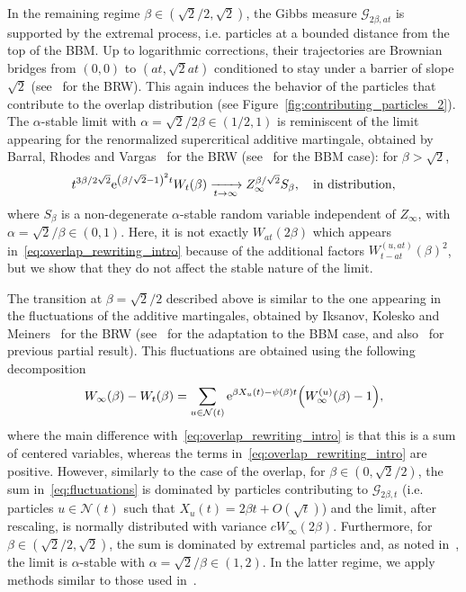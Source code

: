 \documentclass[10pt]{amsart}
\theoremstyle{definition}\newtheorem{defi}[theo]{Definition}\newtheorem{rema}[theo]{Remark}\newtheorem{exam}[theo]{Example}\newtheorem{exem}[theo]{Example}\newtheorem{nota}[theo]{Notation}
\newcommand{\e}{\mathrm{e}}
\newcommand\1{\mathds{1}}
\newcommand{\cG}{\mathcal{G}}
\newcommand{\cN}{\mathcal{N}}
\let\originalleft\left
\let\originalright\right
\renewcommand{\left}{\mathopen{}\mathclose\bgroup\originalleft}
\renewcommand{\right}{\aftergroup\egroup\originalright}
\renewcommand*{\to}{\mathchoice{\longrightarrow}{\rightarrow}{\rightarrow}{\rightarrow}}
\begin{document}
In the remaining regime $\beta \in (\sqrt{2}/2, \sqrt{2})$, the Gibbs measure $\cG_{2\beta, at}$ is supported by the extremal process, i.e. particles at a bounded distance from the top of the BBM. Up to logarithmic corrections, their trajectories are Brownian bridges from $(0,0)$ to $(at,\sqrt{2}at)$ conditioned to stay under a barrier of slope $\sqrt{2}$ (see~\cite{ChenMadauleMallein2019} for the BRW). This again induces the behavior of the particles that contribute to the overlap distribution (see Figure~\ref{fig:contributing_particles_2}). The $\alpha$-stable limit with $\alpha = \sqrt{2}/2\beta \in (1/2, 1)$ is reminiscent of the limit appearing for the renormalized supercritical additive martingale, obtained by Barral, Rhodes and Vargas~\cite{BarralRhodesVargas2018} for the BRW (see~\cite[Remark~2.7]{Bonnefont2022} for the BBM case): for $\beta > \sqrt{2}$,
\begin{equation}\label{eq:supercritical_W}
t^{3\beta/2\sqrt{2}} \e^{\left(\beta/\sqrt{2}-1\right)^2t} W_t(\beta)
\xrightarrow[t\to\infty]{} Z_\infty^{\beta/\sqrt{2}} S_\beta, \quad \text{in distribution},
\end{equation}
where $S_{\beta}$ is a non-degenerate $\alpha$-stable random variable independent of $Z_\infty$, with $\alpha = \sqrt{2}/\beta \in (0,1)$. Here, it is not exactly $W_{at}(2\beta)$ which appears in~\eqref{eq:overlap_rewriting_intro} because of the additional factors $W_{t - at}^{(u, at)}(\beta)^2$, but we show that they do not affect the stable nature of the limit.


The transition at $\beta = \sqrt{2}/2$ described above is similar to the one appearing in the fluctuations of the additive martingales, obtained by Iksanov, Kolesko and Meiners~\cite{IksanovKoleskoMeiners2020} for the BRW (see~\cite{Chataignier2024} for the adaptation to the BBM case, and also~\cite{HartungKlimovsky2018,IksanovKabluchko2016} for previous partial result). This fluctuations are obtained using the following decomposition
\begin{equation}\label{eq:fluctuations}
W_\infty(\beta) - W_t(\beta) = \sum_{u\in\cN(t)} \e^{\beta X_u(t) - \psi(\beta) t} \left(W_\infty^{(u)}(\beta) - 1\right),
\end{equation}
where the main difference with~\eqref{eq:overlap_rewriting_intro} is that this is a sum of centered variables, whereas the terms in~\eqref{eq:overlap_rewriting_intro} are positive. However, similarly to the case of the overlap, for $\beta \in (0,\sqrt{2}/2)$, the sum in~\eqref{eq:fluctuations} is dominated by particles contributing to $\cG_{2\beta,t}$ (i.e. particles $u\in\cN(t)$ such that $X_u(t) = 2\beta t + O(\sqrt{t})$) and the limit, after rescaling, is normally distributed with variance $c W_\infty(2\beta)$. Furthermore, for $\beta \in (\sqrt{2}/2,\sqrt{2})$, the sum is dominated by extremal particles and, as noted in~\cite{Chataignier2024}, the limit is $\alpha$-stable with $\alpha = \sqrt{2}/\beta \in (1, 2)$. In the latter regime, we apply methods similar to those used in~\cite{IksanovKoleskoMeiners2020}.
\end{document}
